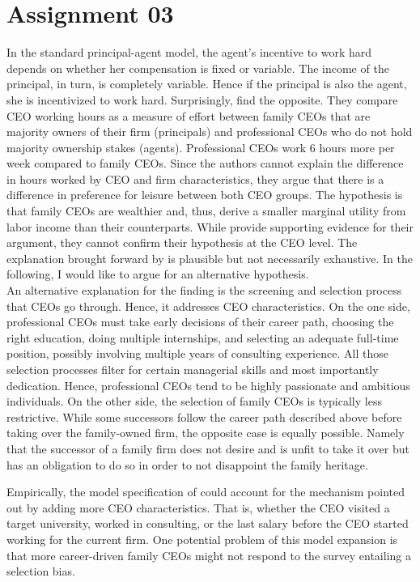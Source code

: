 \newpage
\section{Assignment 03}

In the standard principal-agent model, the agent's incentive to work hard depends on whether her compensation is fixed or variable. The income of the principal, in turn, is completely variable. Hence if the principal is also the agent, she is incentivized to work hard.
Surprisingly, \textcite{bandiera_18} find the opposite. They compare CEO working hours as a measure of effort between family CEOs that are majority owners of their firm (principals) and professional CEOs who do not hold majority ownership stakes (agents). Professional CEOs work 6 hours more per week compared to family CEOs.
Since the authors cannot explain the difference in hours worked by CEO and firm characteristics, they argue that there is a difference in preference for leisure between both CEO groups. 
The hypothesis is that family CEOs are wealthier and, thus, derive a smaller marginal utility from labor income than their counterparts. While \textcite{bandiera_18} provide supporting evidence for their argument, they cannot confirm their hypothesis at the CEO level. 
The explanation brought forward by \textcite{bandiera_18} is plausible but not necessarily exhaustive. In the following, I would like to argue for an alternative hypothesis. \\

An alternative explanation for the finding is the screening and selection process that CEOs go through. Hence, it addresses CEO characteristics.  
On the one side, professional CEOs must take early decisions of their career path, choosing the right education, doing multiple internships, and selecting an adequate full-time position, possibly involving multiple years of consulting experience. All those selection processes filter for certain managerial skills and most importantly dedication. Hence, professional CEOs tend to be highly passionate and ambitious individuals.
On the other side, the selection of family CEOs is typically less restrictive. While some successors follow the career path described above before taking over the family-owned firm, the opposite case is equally possible. Namely that the successor of a family firm does not desire and is unfit to take it over but has an obligation to do so in order to not disappoint the family heritage.

Empirically, the model specification of \textcite{bandiera_18} could account for the mechanism pointed out by adding more CEO characteristics. That is, whether the CEO visited a target university, worked in consulting, or the last salary before the CEO started working for the current firm. 
One potential problem of this model expansion is that more career-driven family CEOs might not respond to the survey entailing a selection bias.

